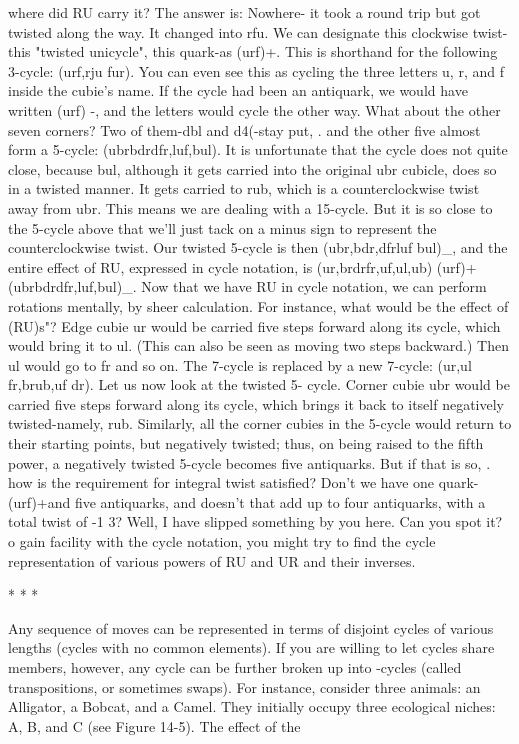 where did RU carry it? The answer is: Nowhere- it took a round trip but got twisted
along the way. It changed into rfu. We can designate this clockwise twist-this "twisted
unicycle", this quark-as (urf)+. This is shorthand for the following 3-cycle: (urf,rju
fur). You can even see this as cycling the three letters u, r, and f inside the cubie's
name. If the cycle had been an antiquark, we would have written (urf) -, and the
letters would cycle the other way.
        What about the other seven corners? Two of them-dbl and d4(-stay put, . and
the other five almost form a 5-cycle: (ubrbdrdfr,luf,bul). It is unfortunate that the
cycle does not quite close, because bul, although it gets carried into the original ubr
cubicle, does so in a twisted manner. It gets carried to rub, which is a
counterclockwise twist away from ubr. This means we are dealing with a 15-cycle.
But it is so close to the 5-cycle above that we'll just tack on a minus sign to represent
the counterclockwise twist. Our twisted 5-cycle is then (ubr,bdr,dfrluf bul)\_, and the
entire effect of RU, expressed in cycle notation, is (ur,brdrfr,uf,ul,ub) (urf)+
(ubrbdrdfr,luf,bul)\_.
Now that we have RU in cycle notation, we can perform rotations mentally, by sheer
calculation. For instance, what would be the effect of (RU)s"? Edge cubie ur would be
carried five steps forward along its cycle, which would bring it to ul. (This can also be
seen as moving two steps backward.) Then ul would go to fr and so on. The 7-cycle is
replaced by a new 7-cycle: (ur,ul fr,brub,uf dr). Let us now look at the twisted 5-
cycle. Corner cubie ubr would be carried five steps forward along its cycle, which
brings it back to itself negatively twisted-namely, rub. Similarly, all the corner cubies
in the 5-cycle would return to their starting points, but negatively twisted; thus, on
being raised to the fifth power, a negatively twisted 5-cycle becomes five antiquarks.
But if that is so, . how is the requirement for integral twist satisfied? Don't we have
one quark-(urf)+and five antiquarks, and doesn't that add up to four antiquarks, with a
total twist of -1 3? Well, I have slipped something by you here. Can you spot it?
o gain facility with the cycle notation, you might try to find the cycle representation of
various powers of RU and UR and their inverses.

                                        *   *   *

Any sequence of moves can be represented in terms of disjoint cycles of various
lengths (cycles with no common elements). If you are willing to let cycles share
members, however, any cycle can be further broken up into -cycles (called
transpositions, or sometimes swaps). For instance, consider three animals: an
Alligator, a Bobcat, and a Camel. They initially occupy three ecological niches: A, B,
and C (see Figure 14-5). The effect of the




